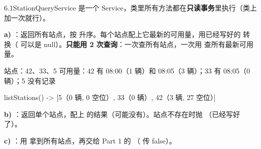 \begin{task}{6.1\quad StationQueryService}
 是一个 Service，类里所有方法都在\textbf{只读事务}里执行（类上加一次就行）。

\textbf{a) }：返回所有站点，按  升序。每个站点配上它最新的可用量，用已经写好的  转换（ 可以是 null）。\textbf{只能用 2 次查询}：一次查所有站点，一次用  查所有最新可用量。

\begin{example}
\begin{plaincode}
站点：42、33、5
可用量：42 有 08:00（1 辆）和 08:05（3 辆）；33 有 08:05（0 辆）；5 没有记录

listStations()  ->  [5（0 辆, 0 空位）, 33（0 辆）, 42（3 辆, 27 空位）]
\end{plaincode}
\end{example}

\textbf{b) }：返回单个站点，配上  的结果（可能没有）。站点不存在时抛 （已经写好了）。

\textbf{c) }：用  拿到所有站点，再交给 Part 1 的 （ 传 false）。
\end{task}

